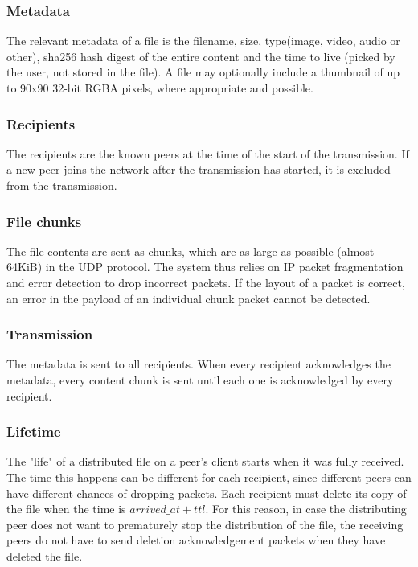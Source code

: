 \documentclass[a4paper, 12pt]{report}
\begin{document}
\subsubsection{Metadata}
The relevant metadata of a file is the filename, size, type(image, video, audio or other), sha256 hash digest of the entire content and the time to live (picked by the user, not stored in the file). A file may optionally include a thumbnail of up to 90x90 32-bit RGBA pixels, where appropriate and possible.

\subsubsection{Recipients}
The recipients are the known peers at the time of the start of the transmission. If a new peer joins the network after the transmission has started, it is excluded from the transmission.

\subsubsection{File chunks}
The file contents are sent as chunks, which are as large as possible (almost 64KiB) in the UDP protocol. The system thus relies on IP packet fragmentation and error detection to drop incorrect packets. If the layout of a packet is correct, an error in the payload of an individual chunk packet cannot be detected.

\subsubsection{Transmission}
The metadata is sent to all recipients. When every recipient acknowledges the metadata, every content chunk is sent until each one is acknowledged by every recipient.

\subsubsection{Lifetime}
The "life" of a distributed file on a peer's client starts when it was fully received. The time this happens can be different for each recipient, since different peers can have different chances of dropping packets. Each recipient must delete its copy of the file when the time is ${arrived\_at + ttl}$. For this reason, in case the distributing peer does not want to prematurely stop the distribution of the file, the receiving peers do not have to send deletion acknowledgement packets when they have deleted the file.
\end{document}
